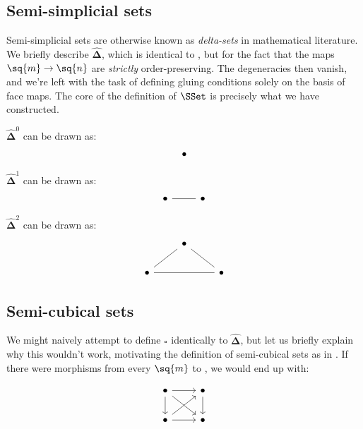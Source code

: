 \documentclass[10pt]{art.cls/art}
\newcommand{\DeltaHat}{\ensuremath{\hat{\boldsymbol{\Delta}}}}
\newcommand{\Cube}[1]{\ensuremath{\boldsymbol{\square^{#1}}}}
\begin{document}
\subsection{Semi-simplicial sets}
Semi-simplicial sets are otherwise known as \emph{delta-sets} in mathematical literature. We briefly describe \DeltaHat, which is identical to \Simplex{}, but for the fact that the maps $\sq{m} \rightarrow \sq{n}$ are \emph{strictly} order-preserving. The degeneracies then vanish, and we're left with the task of defining gluing conditions solely on the basis of face maps. The core of the definition of $\SSet$ is precisely what we have constructed.

\begin{example}[$\DeltaHat^0$, $\DeltaHat^1$, $\DeltaHat^2$]
  $\DeltaHat^0$ can be drawn as:
  \begin{equation*}
    \begin{tikzcd}
      \bullet
    \end{tikzcd}
  \end{equation*}

  $\DeltaHat^1$ can be drawn as:
  \begin{equation*}
    \begin{tikzcd}
      \bullet \arrow[r, dash] & \bullet
    \end{tikzcd}
  \end{equation*}

  $\DeltaHat^2$ can be drawn as:
  \begin{equation*}
    \begin{tikzcd}
      & \bullet\arrow[dr, dash] & \\
      \bullet\arrow[rr, dash]\arrow[ur, dash] && \bullet
    \end{tikzcd}
  \end{equation*}
\end{example}

\subsection{Semi-cubical sets}
We might naively attempt to define $\Cube{}$ identically to \DeltaHat, but let us briefly explain why this wouldn't work, motivating the definition of semi-cubical sets as in \cite{Antolini00}. If there were morphisms from every $\sq{m}$ to , we would end up with:

$$
  \begin{tikzcd}
    \bullet \arrow[r] \arrow[dr] \arrow[d] & \bullet \arrow[d] \\
    \bullet \arrow[r] \arrow[ur] & \bullet
  \end{tikzcd}
$$
\end{document}
